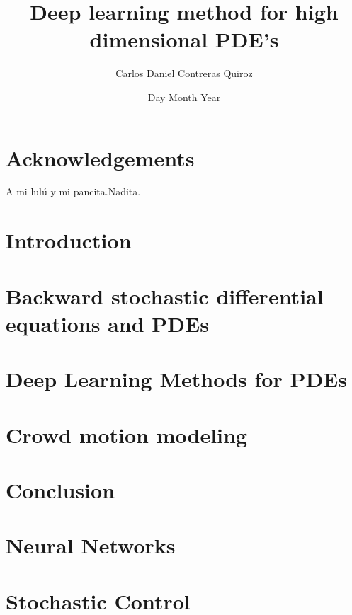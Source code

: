 \documentclass[11pt]{report}
\title{Deep learning method for high dimensional PDE's}
\author{Carlos Daniel Contreras Quiroz}
\date{Day Month Year}
\begin{document}





\chapter*{Acknowledgements}
A mi lulú y mi pancita.Nadita.

\newpage

\tableofcontents
\listoffigures






\chapter{Introduction}


\chapter{Backward stochastic differential equations and PDEs}


\chapter{Deep Learning Methods for PDEs}


\chapter{Crowd motion modeling}


\chapter{Conclusion}


\begin{appendices}
	\chapter{Neural Networks}
	
	\chapter{Stochastic Control}
	
\end{appendices}



\printbibliography
\end{document}

